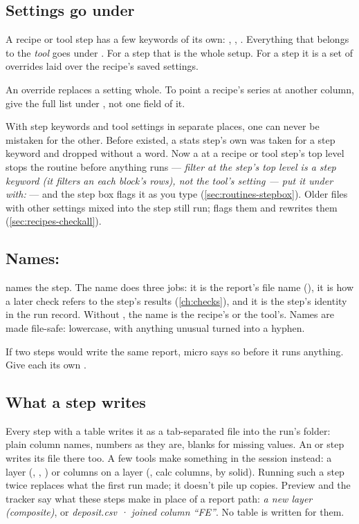 \subsection{Settings go under \texorpdfstring{}{with:}}\label{sec:routines-with}
A recipe or tool step has a few keywords of its own: , , . Everything that belongs to the \emph{tool} goes under . For a  step that is the whole setup. For a  step it is a set of overrides laid over the recipe's saved settings.

An override replaces a setting whole. To point a recipe's series at another column, give the full  list under , not one field of it.

\begin{why}
With step keywords and tool settings in separate places, one can never be mistaken for the other. Before  existed, a stats step's own  was taken for a step keyword and dropped without a word. Now a  at a recipe or tool step's top level stops the routine before anything runs — \emph{filter at the step's top level is a step keyword (it filters an each block's rows), not the tool's setting — put it under with:} — and the step box flags it as you type (\cref{sec:routines-stepbox}). Older files with other settings mixed into the step still run;  flags them and rewrites them (\cref{sec:recipes-checkall}).
\end{why}

\subsection{Names: \texorpdfstring{}{as}}\label{sec:routines-as}
 names the step. The name does three jobs: it is the report's file name (), it is how a later check refers to the step's results (\cref{ch:checks}), and it is the step's identity in the run record. Without , the name is the recipe's or the tool's. Names are made file-safe: lowercase, with anything unusual turned into a hyphen.

If two steps would write the same report, micro says so before it runs anything. Give each its own .

\subsection{What a step writes}
Every step with a table writes it as a tab-separated file into the run's folder: plain column names, numbers as they are, blanks for missing values. An  or  step writes its file there too. A few tools make something in the session instead: a layer (, , ) or columns on a layer (, calc columns, by solid). Running such a step twice replaces what the first run made; it doesn't pile up copies. Preview and the tracker say what these steps make in place of a report path: \emph{a new layer (composite)}, or \emph{deposit.csv · joined column “FE”}. No table is written for them.

